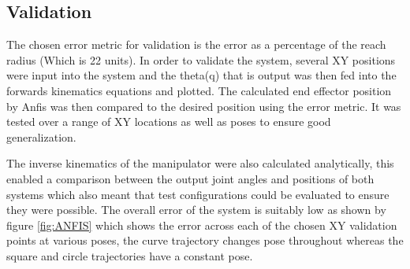 \documentclass[a4paper,11pt]{article}
\begin{document}
\subsection{Validation}
The chosen error metric for validation is the error as a percentage of the reach radius (Which is 22 units). In order to validate the system, several XY positions were input into the system and the theta(q) that is output was then fed into the forwards kinematics equations and plotted. The calculated end effector position by Anfis was then compared to the desired position using the error metric. It was tested over a range of XY locations as well as poses to ensure good generalization.

The inverse kinematics of the manipulator were also calculated analytically, this enabled a comparison between the output joint angles and positions of both systems which also meant that test configurations could be evaluated to ensure they were possible. The overall error of the system is suitably low as shown by figure \ref{fig:ANFIS} which shows the error across each of the chosen XY validation points at various poses, the curve trajectory changes pose throughout whereas the square and circle trajectories have a constant pose.
\end{document}
